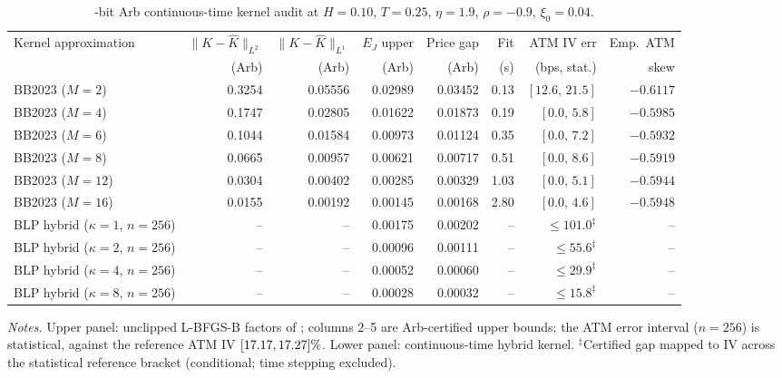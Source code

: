 \begin{table}[t]
\centering
\caption{\ArbBits-bit Arb continuous-time kernel audit at $H=0.10$, $T=0.25$, $\eta=1.9$, $\rho=-0.9$, $\xi_0=0.04$.}
\label{tab:e3_kernel}
\footnotesize
\setlength{\tabcolsep}{4.0pt}
\begin{tabular}{@{}lrrrrrrr@{}}
\toprule
Kernel approximation & $\|K{-}\hat{K}\|_{L^2}$ & $\|K{-}\hat{K}\|_{L^1}$ & $E_J$ upper & Price gap & Fit & ATM IV err & Emp.\ ATM \\
 & (Arb) & (Arb) & (Arb) & (Arb) & (s) & (bps, stat.) & skew \\
\midrule
BB2023 ($M=2$) & 0.3254 & 0.05556 & 0.02989 & 0.03452 & 0.13 & $[12.6,\,21.5]$ & $-0.6117$ \\
BB2023 ($M=4$) & 0.1747 & 0.02805 & 0.01622 & 0.01873 & 0.19 & $[0.0,\,5.8]$ & $-0.5985$ \\
BB2023 ($M=6$) & 0.1044 & 0.01584 & 0.00973 & 0.01124 & 0.35 & $[0.0,\,7.2]$ & $-0.5932$ \\
BB2023 ($M=8$) & 0.0665 & 0.00957 & 0.00621 & 0.00717 & 0.51 & $[0.0,\,8.6]$ & $-0.5919$ \\
BB2023 ($M=12$) & 0.0304 & 0.00402 & 0.00285 & 0.00329 & 1.03 & $[0.0,\,5.1]$ & $-0.5944$ \\
BB2023 ($M=16$) & 0.0155 & 0.00192 & 0.00145 & 0.00168 & 2.80 & $[0.0,\,4.6]$ & $-0.5948$ \\
\midrule
BLP hybrid ($\kappa=1$, $n=256$) & -- & -- & 0.00175 & 0.00202 & -- & $\le 101.0^{\ddagger}$ & -- \\
BLP hybrid ($\kappa=2$, $n=256$) & -- & -- & 0.00096 & 0.00111 & -- & $\le 55.6^{\ddagger}$ & -- \\
BLP hybrid ($\kappa=4$, $n=256$) & -- & -- & 0.00052 & 0.00060 & -- & $\le 29.9^{\ddagger}$ & -- \\
BLP hybrid ($\kappa=8$, $n=256$) & -- & -- & 0.00028 & 0.00032 & -- & $\le 15.8^{\ddagger}$ & -- \\
\bottomrule
\end{tabular}
\par\smallskip
\parbox{\linewidth}{\footnotesize\emph{Notes.} Upper panel: unclipped L-BFGS-B factors of \citet{BayerBreneis2023}; columns 2--5 are Arb-certified upper bounds; the ATM error interval ($n=256$) is statistical, against the \RCBridge{} reference ATM IV $[17.17,17.27]\%$. Lower panel: continuous-time hybrid kernel. $^{\ddagger}$Certified gap mapped to IV across the statistical reference bracket (conditional; time stepping excluded).}
\end{table}
